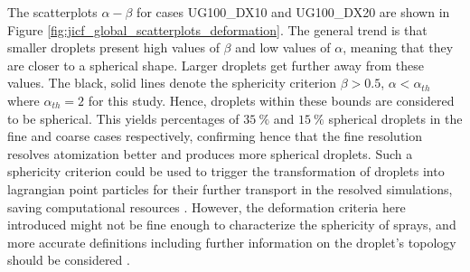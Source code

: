 The scatterplots $\alpha - \beta$ for cases UG100\_DX10 and UG100\_DX20 are shown in Figure \ref{fig:jicf_global_scatterplots_deformation}.  The general trend is that smaller droplets present high values of $\beta$ and low values of $\alpha$, meaning that they are closer to a spherical shape. Larger droplets get further away from these values. The black, solid lines denote the sphericity criterion $\beta > 0.5$, $\alpha < \alpha_{th}$ where $\alpha_{th} = 2$ for this study. Hence, droplets within these bounds are considered to be spherical. This yields percentages of $35~\%$ and $15~\%$ spherical droplets in the fine and coarse cases respectively, confirming hence that the fine resolution resolves atomization better and produces more spherical droplets. Such a sphericity criterion could be used to trigger the transformation of droplets into lagrangian point particles for their further transport in the resolved simulations, saving computational resources . However, the deformation criteria here introduced might not be fine enough to characterize the sphericity of sprays, and more accurate definitions including further information on the droplet's topology should be considered . 

